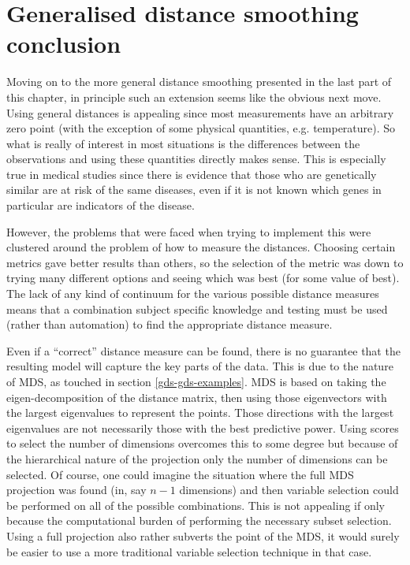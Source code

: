 \section{Generalised distance smoothing conclusion}

Moving on to the more general distance smoothing presented in the last part of this chapter, in principle such an extension seems like the obvious next move. Using general distances is appealing since most measurements have an arbitrary zero point (with the exception of some physical quantities, e.g. temperature). So what is really of interest in most situations is the differences between the observations and using these quantities directly makes sense. This is especially true in medical studies since there is evidence that those who are genetically similar are at risk of the same diseases, even if it is not known which genes in particular are indicators of the disease.

However, the problems that were faced when trying to implement this were clustered around the problem of how to measure the distances. Choosing certain metrics gave better results than others, so the selection of the metric was down to trying many different options and seeing which was best (for some value of best). The lack of any kind of continuum for the various possible distance measures means that a combination subject specific knowledge and testing must be used (rather than automation) to find the appropriate distance measure.

Even if a ``correct'' distance measure can be found, there is no guarantee that the resulting model will capture the key parts of the data. This is due to the nature of MDS, as touched in section \ref{gds-gds-examples}. MDS is based on taking the eigen-decomposition of the distance matrix, then using those eigenvectors with the largest eigenvalues to represent the points. Those directions with the largest eigenvalues are not necessarily those with the best predictive power. Using scores to select the number of dimensions overcomes this to some degree but because of the hierarchical nature of the projection only the number of dimensions can be selected. Of course, one could imagine the situation where the full MDS projection was found (in, say $n-1$ dimensions) and then variable selection could be performed on all of the possible combinations. This is not appealing if only because the computational burden of performing the necessary subset selection. Using a full projection also rather subverts the point of the MDS, it would surely be easier to use a more traditional variable selection technique in that case.

